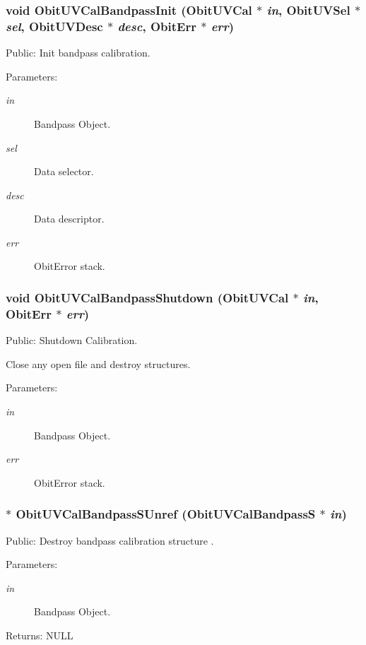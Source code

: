 \subsubsection{\setlength{\rightskip}{0pt plus 5cm}void Obit\-UVCal\-Bandpass\-Init ({\bf Obit\-UVCal} $\ast$ {\em in}, {\bf Obit\-UVSel} $\ast$ {\em sel}, {\bf Obit\-UVDesc} $\ast$ {\em desc}, {\bf Obit\-Err} $\ast$ {\em err})}\label{ObitUVCalBandpass_8h_a0}


Public: Init bandpass calibration. 

\begin{Desc}
\item[Parameters:]
\begin{description}
\item[{\em in}]Bandpass Object. \item[{\em sel}]Data selector. \item[{\em desc}]Data descriptor. \item[{\em err}]Obit\-Error stack. \end{description}
\end{Desc}
\subsubsection{\setlength{\rightskip}{0pt plus 5cm}void Obit\-UVCal\-Bandpass\-Shutdown ({\bf Obit\-UVCal} $\ast$ {\em in}, {\bf Obit\-Err} $\ast$ {\em err})}\label{ObitUVCalBandpass_8h_a2}


Public: Shutdown Calibration. 

Close any open file and destroy structures. \begin{Desc}
\item[Parameters:]
\begin{description}
\item[{\em in}]Bandpass Object. \item[{\em err}]Obit\-Error stack. \end{description}
\end{Desc}
\subsubsection{$\ast$ Obit\-UVCal\-Bandpass\-SUnref ({\bf Obit\-UVCal\-Bandpass\-S} $\ast$ {\em in})}\label{ObitUVCalBandpass_8h_a3}


Public: Destroy bandpass calibration structure . 

\begin{Desc}
\item[Parameters:]
\begin{description}
\item[{\em in}]Bandpass Object. \end{description}
\end{Desc}
\begin{Desc}
\item[Returns:]NULL \end{Desc}
